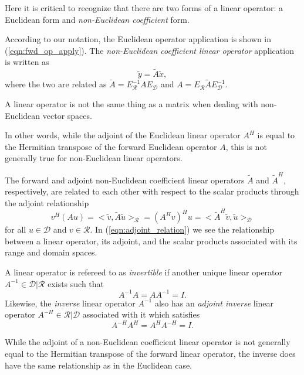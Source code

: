Here it is critical to recognize that there are two forms of a linear
operator: a Euclidean form and {}\textit{non-Euclidean coefficient} form.

According to our notation, the Euclidean operator application is shown in
(\ref{eqn:fwd_op_apply}).  The {}\textit{non-Euclidean coefficient linear
operator} application is written as
%
\begin{equation}
\tilde{y} = \tilde{A} \tilde{x},
\label{eqn:fwd_op_apply_euclidean}
\end{equation}
%
where the two are related as $\tilde{A} = E_{\mathcal{R}}^{-1} A
E_{\mathcal{D}}$ and $A = E_{\mathcal{R}} {}\tilde{A} E_{\mathcal{D}}^{-1}$.

{}\begin{dumb_fact} A linear operator is not the same thing as a matrix when
dealing with non-Euclidean vector spaces.
{}\end{dumb_fact}

In other words, while the adjoint of the Euclidean linear operator $A^H$ is
equal to the Hermitian transpose of the forward Euclidean operator $A$, this is
not generally true for non-Euclidean linear operators.

The forward and adjoint non-Euclidean coefficient linear operators
$\tilde{A}$ and $\tilde{A}^H$, respectively, are related to each other with
respect to the scalar products through the adjoint relationship
%
\begin{equation}
v^H (A u)
= <\tilde{v},\tilde{A} \tilde{u}>_{\mathcal{R}}
= (A^H v)^H u
= <\tilde{A}^H \tilde{v},\tilde{u}>_{\mathcal{D}}
\label{eqn:adjoint_relation}
\end{equation}
%
for all $u\in\mathcal{D}$ and $v\in\mathcal{R}$.  In
(\ref{eqn:adjoint_relation}) we see the relationship between a linear
operator, its adjoint, and the scalar products associated with its range and
domain spaces.

A linear operator is refereed to as {}\textit{invertible} if another unique
linear operator $A^{-1}\in\mathcal{D}|\mathcal{R}$ exists such that
%
\[
A^{-1} A = A A^{-1} = I.
\]
%
Likewise, the {}\textit{inverse} linear operator $A^{-1}$ also has an
{}\textit{adjoint inverse} linear operator $A^{-H}\in\mathcal{R}|\mathcal{D}$
associated with it which satisfies
%
\[
A^{-H} A^H = A^H A^{-H} = I.
\]
%

While the adjoint of a non-Euclidean coefficient linear operator is not
generally equal to the Hermitian transpose of the forward linear operator, the
inverse does have the same relationship as in the Euclidean case.

